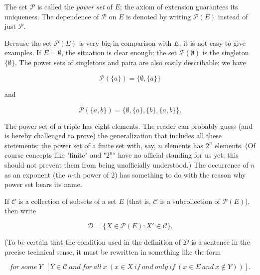 The set $ \mathcal{P} $ is called the \textit{power set} of $E$; the axiom of extension guarantees its uniqueness. The dependence of $ \mathcal{P} $ on $E$ is denoted by writing $ \mathcal{P} (E) $ instead of just $ \mathcal{P} $.

Because the set $ \mathcal{P} (E) $ is very big in comparison with $E$, it is not easy to give examples. If $E = \emptyset $, the situation is clear enough; the set $ \mathcal{P} ( \emptyset ) $ is the singleton $\{ \emptyset \}$. The power sets of singletons and paira are also easily describable; we have 

\begin{equation*}
\mathcal{P} ( \{ a \} ) = \{ \emptyset, \{ a \} \} 
\end{equation*}

and 

\begin{equation*}
\mathcal{P} ( \{ a, b \} ) = \{ \emptyset, \{ a \} , \{ b \} , \{ a,b \} \} .
\end{equation*}

The power set of a triple has eight elements. The reader can probably guess (and is hereby challenged to prove) the generalization that includes all these stetements: the power set of a finite set with, say, $n$ elements has $2^{n}$ elements. (Of course concepts like "finite" and "$2^{n}$" have no official standing for us yet; this should not prevent them from being unofficially understood.) The occurrence of $n$ as an exponent (the $n$-th power of 2) has something to do with the reason why power set bears its name. 

If $ \mathcal{C} $ is a collection of subsets of a set $E$ (that is, $ \mathcal{C} $ is a subcollection of $ \mathcal{P} (E) $), then write

\begin{equation*}
\mathcal{D} = \{ X \in \mathcal{P} (E): X' \in \mathcal{C} \} .
\end{equation*}

(To be certain that the condition used in the definition of $ \mathcal{D} $ is a sentence in the precise technical sense, it must be rewritten in something like the form 

\begin{equation*}
for \: some \: Y \:\ [ Y \in \mathcal{C} \: and \: for \: all \: x\ ( x \in X \: if \: and \: only \: if \: (x \in E \: and \: x \notin Y)) ] .  
\end{equation*}

